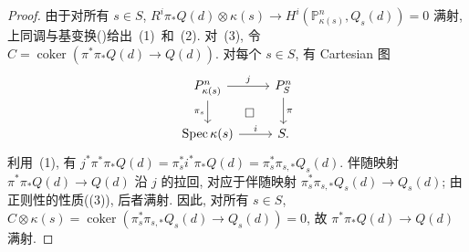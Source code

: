 \begin{proof}
由于对所有 $s\in S$, 
$R^i\pi_*Q(d)\otimes\kappa(s)\to H^i(\mathbb P_{\kappa(s)}^n,Q_s(d))=0$
满射, 上同调与基变换()给出~(1)~和~(2).
对~(3), 令 $C=\operatorname{coker}(\pi^*\pi_*Q(d)\to Q(d))$.
对每个 $s\in S$, 有 Cartesian 图
\[
\begin{tikzcd}
\mathbb P_{\kappa(s)}^n\arrow[r,"j"]\arrow[d,"\pi_s"']
\arrow[dr,phantom,"\square"]&
\mathbb P_S^n\arrow[d,"\pi"]\\
\operatorname{Spec}\kappa(s)\arrow[r,"i"]&S.
\end{tikzcd}
\]
利用~(1), 有
$j^*\pi^*\pi_*Q(d)=\pi_s^*i^*\pi_*Q(d)=\pi_s^*\pi_{s,*}Q_s(d)$.
伴随映射 $\pi^*\pi_*Q(d)\to Q(d)$ 沿 $j$ 的拉回, 对应于伴随映射
$\pi_s^*\pi_{s,*}Q_s(d)\to Q_s(d)$; 
由正则性的性质((3)), 后者满射.
因此, 对所有 $s\in S$, 
$C\otimes\kappa(s)=\operatorname{coker}(\pi_s^*\pi_{s,*}Q_s(d)\to Q_s(d))=0$, 
故 $\pi^*\pi_*Q(d)\to Q(d)$ 满射.
\end{proof}
